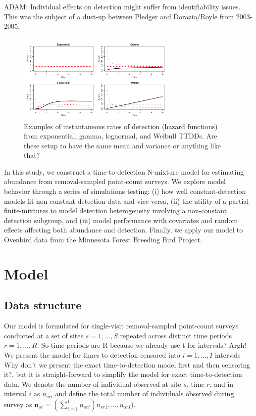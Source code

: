 \documentclass[useAMS,usenatbib,referee,12pt]{article}
\newcommand{\adam}[1]{{\color{blue} ADAM: #1}}
\newcommand{\jarad}[1]{{\color{red} #1}}
\newcommand{\vn}{\textbf{n}}
\begin{document}
\adam{Individual effects on detection might suffer from identifiability issues. This was the subject of a dust-up between Pledger and Dorazio/Royle from 2003-2005.}

\begin{figure}[h!]\centering
\includegraphics[width=0.68\textwidth]{Hazards}
\caption{Examples of instantaneous rates of detection (hazard functions) from exponential, gamma, lognormal, and Weibull TTDDs. \jarad{Are these setup to have the same mean and variance or anything like that?}}
\label{HazardFxns}
\end{figure}

In this study, we construct a time-to-detection N-mixture model for estimating abundance from removal-sampled point-count surveys.  We explore model behavior through a series of simulations testing: (i) how well constant-detection models fit non-constant detection data and vice versa, (ii) the utility of a partial finite-mixtures to model detection heterogeneity involving a non-constant detection subgroup, and (iii) model performance with covariates and random effects affecting both abundance and detection.  Finally, we apply our model to Ovenbird data from the Minnesota Forest Breeding Bird Project.




\section{Model}\label{sec:model}

\subsection{Data structure}\label{sec:data}

Our model is formulated for single-visit removal-sampled point-count surveys conducted at a set of sites $s=1,\dotso,S$ repeated across distinct time periods $r=1,\dotso,R$. \jarad{So time periods are R because we already use t for intervals? Argh!}  We present the model for times to detection censored into $i=1,\dotso,I$ intervals \jarad{Why don't we present the exact time-to-detection model first and then censoring it?}, but it is straight-forward to simplify the model for exact time-to-detection data.  
We denote the number of individual observed at site $s$, time $r$, and in interval $i$ as $n_{sri}$ and define the total number of individuals observed during survey as $\vn_{sr} = (\sum_{i=1}^I n_{sri})n_{sr1},\ldots,n_{srI})$.
\end{document}
